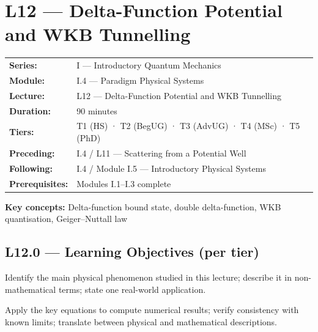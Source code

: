 \renewcommand{\lectureCode}{I.4 / L12}

\section*{L12 — Delta-Function Potential and WKB Tunnelling}
\label{sec:L12}

\begin{tcolorbox}[lecturebox, title={Module I.4 / L12 — Metadata}]
\begin{tabular}{@{}ll@{}}
\textbf{Series:}    & I — Introductory Quantum Mechanics \\
\textbf{Module:}    & I.4 — Paradigm Physical Systems \\
\textbf{Lecture:}   & L12 — Delta-Function Potential and WKB Tunnelling \\
\textbf{Duration:}  & 90 minutes \\
\textbf{Tiers:}     & T1 (HS) · T2 (BegUG) · T3 (AdvUG) · T4 (MSc) · T5 (PhD) \\
\textbf{Preceding:} & I.4 / L11 — Scattering from a Potential Well \\
\textbf{Following:} & I.4 / Module I.5 — Introductory Physical Systems \\
\textbf{Prerequisites:} & Modules I.1–I.3 complete \\
\end{tabular}

\medskip
\textbf{Key concepts:} Delta-function bound state, double delta-function, WKB quantisation, Geiger–Nuttall law
\end{tcolorbox}

\subsection*{L12.0 — Learning Objectives (per tier)}
\label{sec:L12.0}

\quad
Identify the main physical phenomenon studied in this lecture; describe it in
non-mathematical terms; state one real-world application.

\quad
Apply the key equations to compute numerical results; verify consistency with
known limits; translate between physical and mathematical descriptions.

